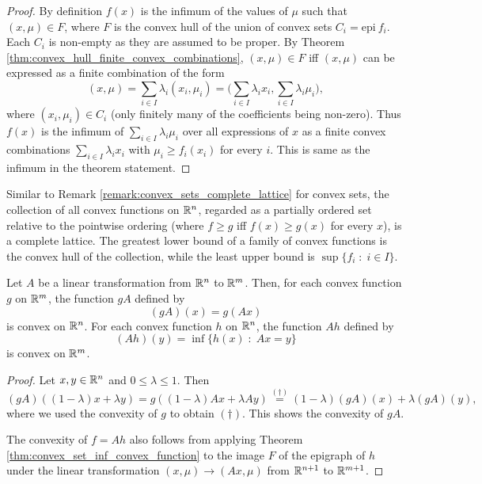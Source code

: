 \documentclass[11pt,a4paper]{article}
\begin{document}
\begin{proof}
    By definition $f(x)$ is the infimum of the values of $\mu$ such that $(x,\mu)\in F$, where $F$ is the convex hull of the union of convex sets $C_i = \mathrm{epi}\ f_i$. Each $C_i$ is non-empty as they are assumed to be proper. By Theorem \ref{thm:convex_hull_finite_convex_combinations}, $(x,\mu)\in F$ iff $(x,\mu)$ can be expressed as a finite combination of the form
    \begin{equation*}
        (x,\mu) = \sum_{i\in I} \lambda_i (x_i,\mu_i) = \bigg(\sum_{i\in I}\lambda_i x_i, \sum_{i\in I}\lambda_i \mu_i \bigg),
    \end{equation*}
    where $(x_i,\mu_i)\in C_i$ (only finitely many of the coefficients being non-zero). Thus $f(x)$ is the infimum of $\sum_{i\in I}\lambda_i \mu_i$ over all expressions of $x$ as a finite convex combinations $\sum_{i\in I}\lambda_i x_i$ with $\mu_i\ge f_i(x_i)$ for every $i$. This is same as the infimum in the theorem statement.
\end{proof}

\begin{remark}
    Similar to Remark \ref{remark:convex_sets_complete_lattice} for convex sets, the collection of all convex functions on $\mathbb{R}^n$, regarded as a partially ordered set relative to the pointwise ordering (where $f\ge g$ iff $f(x)\ge g(x)$ for every $x$), is a complete lattice. The greatest lower bound of a family of convex functions is the convex hull of the collection, while the least upper bound is $\sup\{f_i\;:\;i\in I\}$. 
\end{remark}

\begin{theorem}\label{thm:convex_function_linear_transformation}
    Let $A$ be a linear transformation from $\mathbb{R}^n$ to $\mathbb{R}^m$. Then, for each convex function $g$ on $\mathbb{R}^m$, the function $gA$ defined by
    \begin{equation*}
        (gA)(x) = g(Ax)
    \end{equation*}
    is convex on $\mathbb{R}^n$. For each convex function $h$ on $\mathbb{R}^n$, the function $Ah$ defined by
    \begin{equation*}
        (Ah)(y) = \inf\{h(x)\;:\;Ax = y\}
    \end{equation*}
    is convex on $\mathbb{R}^m$.  
\end{theorem}

\begin{proof}
    Let $x,y\in \mathbb{R}^n$ and $0\le \lambda\le 1$. Then 
    \begin{equation*}
        (gA)((1-\lambda)x+\lambda y) = g((1-\lambda)Ax+\lambda Ay) \overset{(\dagger)}{=} (1-\lambda)(gA)(x) + \lambda (gA)(y),
    \end{equation*}
    where we used the convexity of $g$ to obtain $(\dagger)$. This shows the convexity of $gA$.

    \noindent The convexity of $f = Ah$ also follows from applying Theorem \ref{thm:convex_set_inf_convex_function} to the image $F$ of the epigraph of $h$ under the linear transformation $(x,\mu)\rightarrow (Ax,\mu)$ from $\mathbb{R}^{n+1}$ to $\mathbb{R}^{m+1}$.
\end{proof}
\end{document}
